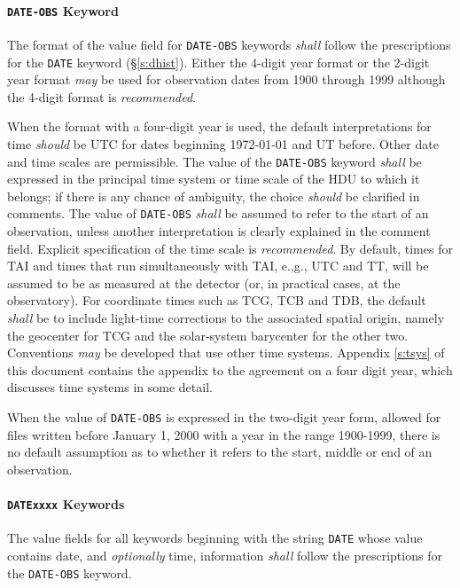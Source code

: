 \documentclass[11pt,makeidx]{book}     %
\begin{document}
 \paragraph{{\tt DATE-OBS} Keyword}
 The format of the value field for {\tt DATE-OBS} keywords 
 {\em shall} follow the prescriptions for the {\tt DATE}
 keyword (\S\ref{s:dhist}).  Either the 4-digit year format or 
 the 2-digit year format {\em may} be used for observation dates from 1900
 through 1999 although the 4-digit format is {\em recommended}.

 When the format with a four-digit year is used,
 the default interpretations for time {\em should} be 
 UTC for dates beginning 1972-01-01 and UT 
 before.  Other date and time scales are permissible.  The value of 
 the {\tt DATE-OBS} keyword {\em shall} be expressed in the principal time 
 system or time scale of the HDU 
 to which it belongs; if there is any 
 chance of ambiguity, the choice {\em should} be clarified in comments.   
 The value of {\tt DATE-OBS} {\em shall} be
 assumed to refer to the start of an observation, unless another 
 interpretation is clearly explained in the comment field.
 Explicit specification of the time scale is {\em recommended}.  
 By default, times for TAI and times that run simultaneously with TAI, 
 e.,g., UTC and TT,  will be assumed to be as measured at the detector 
 (or, in practical cases, at the observatory).  For coordinate times
 such as TCG, TCB and TDB, the default {\em shall} be
 to include light-time corrections to the associated spatial origin,
 namely the geocenter for TCG and the solar-system barycenter for the
 other two.  Conventions 
 {\em may} be developed that use other time systems. Appendix \ref{s:tsys}
 of this document contains the appendix to the agreement
 on a four digit year, which discusses time systems in some detail.  
 
 When the value of {\tt DATE-OBS} is expressed in the two-digit year 
 form, allowed for files
 written before January 1, 2000 with a year in the range 1900-1999, 
 there is no default assumption as to whether it refers to the start, 
 middle or end of an observation.

 \paragraph{{\tt DATExxxx} Keywords}
 The value fields for all keywords beginning with the string {\tt DATE}
 whose value contains date, and {\em optionally} time, information
 {\em shall} follow the prescriptions for the {\tt DATE-OBS}
 keyword.
                     
\end{document}
